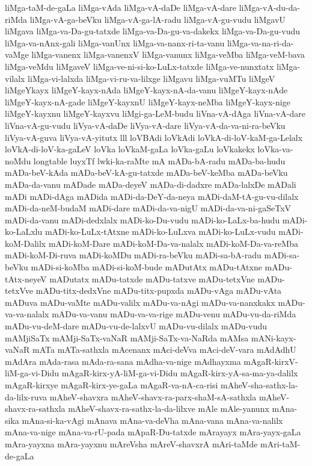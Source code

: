 {liMga-taM-de-gaLa
liMga-vAda
liMga-vA-daDe
liMga-vA-dare
liMga-vA-du-da-riMda
liMga-vA-ga-beVku
liMga-vA-ga-lA-radu
liMga-vA-gu-vudu
liMgavU
liMgava
liMga-va-Da-gu-tatxde
liMga-va-Da-gu-va-dakekx
liMga-va-Da-gu-vudu
liMga-va-nAnx-gali
liMga-vanUnx
liMga-va-nanx-ri-ta-vanu
liMga-va-na-ri-da-vaMge
liMga-vanenx
liMga-vanenxV
liMga-vanunx
liMga-veMba
liMga-veM-bava
liMga-veMdu
liMgaveV
liMga-ve-ni-si-ko-LuLx-tatxde
liMga-ve-nunxtatx
liMga-vilalx
liMga-vi-lalxda
liMga-vi-ru-va-lilxge
liMgavu
liMga-vuMTu
liMgeV
liMgeYkayx
liMgeY-kayx-nAda
liMgeY-kayx-nA-da-vanu
liMgeY-kayx-nAde
liMgeY-kayx-nA-gade
liMgeY-kayxnU
liMgeY-kayx-neMba
liMgeY-kayx-nige
liMgeY-kayxnu
liMgeY-kayxvu
liMgi-ga-LeM-budu
liVna-vA-dAga
liVna-vA-dare
liVna-vA-gu-vudu
liVya-vA-daDe
liVya-vA-dare
liVya-vA-da-va-ni-ra-beVku
liVya-vA-guva
liVya-vA-yitutx
lll
loVBAdi
loVkAdi
loVkA-di-loV-kaM-ga-Lelalx
loVkA-di-loV-ka-gaLeV
loVka
loVkaM-gaLa
loVka-gaLu
loVkakekx
loVka-va-noMdu
longtable
luyxTf
lwki-ka-raMte
mA
mADa-bA-radu
mADa-ba-hudu
mADa-beV-kAda
mADa-beV-kA-gu-tatxde
mADa-beV-keMba
mADa-beVku
mADa-da-vanu
mADade
mADa-deyeV
mADa-di-dadxre
mADa-lalxDe
mADali
mADi
mADi-dAga
mADida
mADi-da-DeY-da-neya
mADi-daM-tA-gu-vu-dilalx
mADi-da-neM-budaM
mADi-dare
mADi-da-va-nigU
mADi-da-va-ni-gaSeTxV
mADi-da-vanu
mADi-dedxlalx
mADi-ko-Du-vudu
mADi-ko-LaLx-ba-hudu
mADi-ko-LaLxlu
mADi-ko-LuLx-tAtxne
mADi-ko-LuLxva
mADi-ko-LuLx-vudu
mADi-koM-Dalilx
mADi-koM-Dare
mADi-koM-Da-va-nalalx
mADi-koM-Da-va-reMba
mADi-koM-Di-ruva
mADi-koMDu
mADi-ra-beVku
mADi-sa-bA-radu
mADi-sa-beVku
mADi-si-koMba
mADi-si-koM-bude
mADutAtx
mADu-tAtxne
mADu-tAtx-neyeV
mADutatx
mADu-tatxde
mADu-tatxve
mADu-tetxVne
mADu-tetxVve
mADu-titx-dedxVne
mADu-titx-pupxda
mADu-vAga
mADu-vAta
mADuva
mADu-vaMte
mADu-valilx
mADu-va-nAgi
mADu-va-nanxkakx
mADu-va-va-nalalx
mADu-va-vanu
mADu-va-va-rige
mADu-venu
mADu-vu-da-riMda
mADu-vu-deM-dare
mADu-vu-de-lalxvU
mADu-vu-dilalx
mADu-vudu
mAMjiSaTx
mAMji-SaTx-vaNaR
mAMji-SaTx-va-NaRda
mAMsa
mANi-kayx-vaNaR
mATa
mATa-sathxla
mAcenanx
mAci-deVva
mAci-deV-vara
mAdAdhU
mAdAra
mAda-rasa
mAda-ra-sana
mAdha-va-nige
mAdhayxma
mAgaR-kirxV-liM-ga-vi-Didu
mAgaR-kirx-yA-liM-ga-vi-Didu
mAgaR-kirx-yA-sa-ma-ya-dalilx
mAgaR-kirxye
mAgaR-kirx-ye-gaLa
mAgaR-va-nA-ca-risi
mAheV-sha-sathx-la-da-lilx-ruva
mAheV-shavxra
mAheV-shavx-ra-parx-shaM-sA-sathxla
mAheV-shavx-ra-sathxla
mAheV-shavx-ra-sathx-la-da-lilxve
mAle
mAle-yanunx
mAna-sika
mAna-si-ka-vAgi
mAnava
mAna-va-deVha
mAna-vana
mAna-va-nalilx
mAna-va-nige
mAna-va-rU-pada
mApaR-Du-tatxde
mArayayx
mAra-yayx-gaLa
mAra-yayxna
mAra-yayxnu
mAreVsha
mAreV-shavxrA
mAri-taMde
mAri-taM-de-gaLa
}
